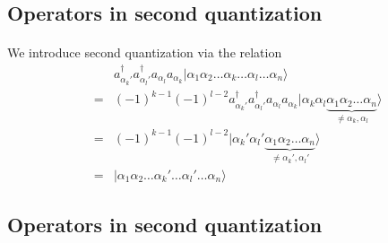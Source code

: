 \documentclass[%
twoside,                 %
final,                   %
10pt]{article}
\begin{document}
\subsection{Operators in second quantization}

\paragraph{}
We introduce second quantization via the relation
\begin{eqnarray}
	&& a_{\alpha_k'}^{\dagger} a_{\alpha_l'}^{\dagger} a_{\alpha_l} a_{\alpha_k} 
		|\alpha_1\alpha_2\dots\alpha_k\dots\alpha_l\dots\alpha_n\rangle \nonumber \\
	&=& (-1)^{k-1} (-1)^{l-2} a_{\alpha_k'}^{\dagger} a_{\alpha_l'}^{\dagger} a_{\alpha_l} a_{\alpha_k}
		|\alpha_k\alpha_l \underbrace{\alpha_1\alpha_2\dots\alpha_n}_{\neq \alpha_k,\alpha_l}\rangle \nonumber \\
	&=& (-1)^{k-1} (-1)^{l-2} 
	|\alpha_k'\alpha_l' \underbrace{\alpha_1\alpha_2\dots\alpha_n}_{\neq \alpha_k',\alpha_l'}\rangle \nonumber \\
	&=& |\alpha_1\alpha_2\dots\alpha_k'\dots\alpha_l'\dots\alpha_n\rangle \label{eq:2-35}
\end{eqnarray}







\subsection{Operators in second quantization}

\end{document}

